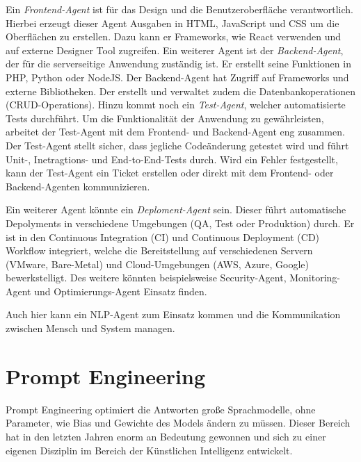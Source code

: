 Ein \textit{Frontend-Agent} ist für das Design und die Benutzeroberfläche verantwortlich. Hierbei erzeugt dieser Agent Ausgaben in HTML, JavaScript und CSS um die Oberflächen zu erstellen. Dazu kann er Frameworks, wie React verwenden und auf externe Designer Tool zugreifen. Ein weiterer Agent ist der \textit{Backend-Agent}, der für die serverseitige Anwendung zuständig ist. Er erstellt seine Funktionen in PHP, Python oder NodeJS. Der Backend-Agent hat Zugriff auf Frameworks und externe Bibliotheken. Der erstellt und verwaltet zudem die Datenbankoperationen (CRUD-Operations). Hinzu kommt noch ein \textit{Test-Agent}, welcher automatisierte Tests durchführt. Um die Funktionalität der Anwendung zu gewährleisten, arbeitet der Test-Agent mit dem Frontend- und Backend-Agent eng zusammen. Der Test-Agent stellt sicher, dass jegliche Codeänderung getestet wird und führt Unit-, Inetragtions- und End-to-End-Tests durch. Wird ein Fehler festgestellt, kann der Test-Agent ein Ticket erstellen oder direkt mit dem Frontend- oder Backend-Agenten kommunizieren.\vspace{0.2cm}

Ein weiterer Agent könnte ein \textit{Deploment-Agent} sein. Dieser führt automatische Depolyments in verschiedene Umgebungen (QA, Test oder Produktion) durch. Er ist in den Continuous Integration (CI) und Continuous Deployment (CD) Workflow integriert, welche die Bereitstellung auf verschiedenen Servern (VMware, Bare-Metal) und Cloud-Umgebungen (AWS, Azure, Google) bewerkstelligt. Des weitere könnten beispielsweise Security-Agent, Monitoring-Agent und Optimierungs-Agent Einsatz finden.\vspace{0.2cm}

Auch hier kann ein NLP-Agent zum Einsatz kommen und die Kommunikation zwischen Mensch und System managen.



\section{Prompt Engineering}
Prompt Engineering optimiert die Antworten große Sprachmodelle, ohne Parameter, wie Bias und Gewichte des Models ändern zu müssen. Dieser Bereich hat in den letzten Jahren enorm an Bedeutung gewonnen und sich zu einer eigenen Disziplin im Bereich der Künstlichen Intelligenz entwickelt.\vspace{0.2cm}

